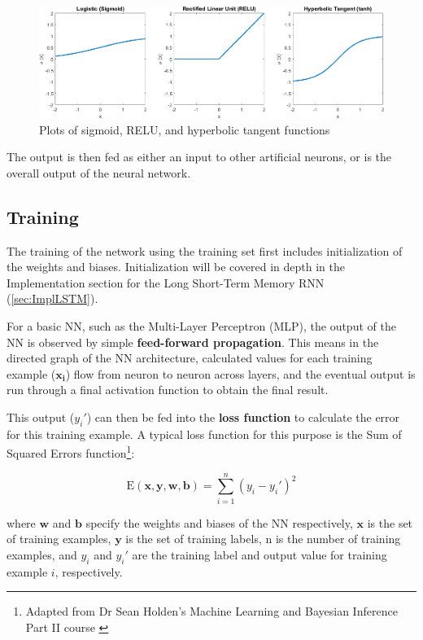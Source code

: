 \documentclass[12pt,a4paper,twoside,openright]{report}
\renewcommand{\vec}[1]{\mathbf{#1}}
\begin{document}
\begin{figure}[h]
\includegraphics[width=\textwidth]{ActivationFunsCrop.png}
\caption{Plots of sigmoid, RELU, and hyperbolic tangent functions}
\end{figure}

The output is then fed as either an input to other artificial neurons, or is the overall
output of the neural network.

\subsection{Training}
\label{sec:introTraining}

The training of the network using the training set first includes initialization of the 
weights and biases. Initialization will be covered in depth in the Implementation section
for the Long Short-Term Memory RNN (\cref{sec:ImplLSTM}).

For a basic NN, such as the Multi-Layer Perceptron (MLP), the output of the NN is
observed by simple \textbf{feed-forward propagation}. This means in the directed graph
of the NN architecture, calculated values for each training example ($\vec{x_i}$)
flow from neuron to neuron across layers, and the eventual
output is run through a final activation function to obtain the final result.

This output ($y_i'$) can then be fed into the \textbf{loss function} to calculate the error for this
training example. A typical loss function for this purpose is the Sum of Squared Errors 
function\footnote{Adapted from Dr Sean Holden's Machine Learning and Bayesian Inference Part II course \cite{Holden18}}:

\begin{equation}
\text{E}(\vec{x}, \vec{y}, \vec{w}, \vec{b})  = \sum_{i=1}^{n} (y_i - y_i')^2
\end{equation}

where $\vec{w}$ and $\vec{b}$ specify the weights and biases of the NN respectively, 
$\vec{x}$ is the set of training examples,
$\vec{y}$ is the set of training labels, n is the number of training examples, and $y_i$ and $y_i'$
are the training label and output value for training example $i$, respectively.
\end{document}
